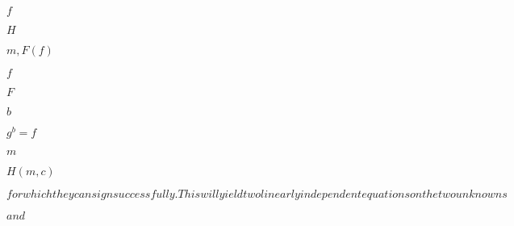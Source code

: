 \documentclass[10pt]{book}
\begin{document}
\begin{mdSnippets}
\begin{mdInlineSnippet}%
$f$\end{mdInlineSnippet}%
\begin{mdInlineSnippet}[c1d9f50f86825a1a2302ec2449c17196]%
$H$\end{mdInlineSnippet}%
\begin{mdInlineSnippet}[144e2afd3382d3f25f79f6602b0b5967]%
$m,F(f)$\end{mdInlineSnippet}%
\begin{mdInlineSnippet}%
$f$\end{mdInlineSnippet}%
\begin{mdInlineSnippet}[800618943025315f869e4e1f09471012]%
$F$\end{mdInlineSnippet}%
\begin{mdInlineSnippet}%
$b$\end{mdInlineSnippet}%
\begin{mdInlineSnippet}[9bd123eb16910b3ff1ebfeb5ec54ea47]%
$g^b=f$\end{mdInlineSnippet}%
\begin{mdInlineSnippet}[6f8f57715090da2632453988d9a1501b]%
$m$\end{mdInlineSnippet}%
\begin{mdInlineSnippet}[b30d983384207908528512508f78d805]%
$H(m,c)$\end{mdInlineSnippet}%
\begin{mdInlineSnippet}%
$ for which they can sign successfully. This will yield two linearly independent equations on the two unknowns $\end{mdInlineSnippet}%
\begin{mdInlineSnippet}[0060636b449d1da5a8581bfee180f0c2]%
$ and $\end{mdInlineSnippet}%

\end{mdSnippets}
\end{document}
